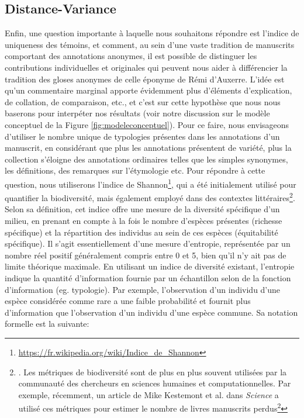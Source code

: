 \documentclass[a4paper, twoside, 12pt]{book}
\begin{document}
{\subsection{Distance-Variance}


Enfin, une question importante à laquelle nous souhaitons répondre est l'indice de \og{} uniqueness \fg{} des témoins, et comment, au sein d'une vaste tradition de manuscrits comportant des annotations anonymes, il est possible de distinguer les contributions individuelles et originales qui peuvent nous aider à différencier la tradition des gloses anonymes de celle éponyme de Rémi d'Auxerre. L'idée est qu'un commentaire marginal apporte évidemment plus d'éléments d'explication, de collation, de comparaison, etc., et c'est sur cette hypothèse que nous nous baserons pour interpéter nos résultats (voir notre discussion sur le modèle conceptuel de la Figure \ref{fig:modeleconceptuel}). Pour ce faire, nous envisageons d'utiliser le nombre unique de typologies présentes dans les annotations d'un manuscrit, en considérant que plus les annotations présentent de variété, plus la collection s'éloigne des annotations \og{}ordinaires\fg{} telles que les \og{}simples\fg{} synonymes, les définitions, des remarques sur l'étymologie etc. Pour répondre à cette question, nous utiliserons l'indice de Shannon\footnote{\url{https://fr.wikipedia.org/wiki/Indice_de_Shannon}}, qui a été initialement utilisé pour quantifier la biodiversité, mais également employé dans des contextes littéraires\footnote{\cite{bache2013diversity}. Les métriques de biodiversité sont de plus en plus souvent utilisées par la communauté des chercheurs en sciences humaines et computationnelles. Par exemple, récemment, un article de Mike Kestemont et al. dans \textit{Science} a utilisé ces métriques pour estimer le nombre de livres manuscrits perdus\footnote{Kestemont et al., \textit{Science}, 2022}}.\\

Selon sa définition, cet indice offre une mesure de la diversité spécifique d'un milieu, en prenant en compte à la fois le nombre d'espèces présentes (richesse spécifique) et la répartition des individus au sein de ces espèces (équitabilité spécifique). Il s'agit essentiellement d'une mesure d'entropie, représentée par un nombre réel positif généralement compris entre 0 et 5, bien qu'il n'y ait pas de limite théorique maximale. En utilisant un indice de diversité existant, l'entropie indique la quantité d'information fournie par un échantillon selon de la fonction d'information (eg. typologie). Par exemple, l'observation d'un individu d'une espèce considérée comme rare a une faible probabilité et fournit plus d'information que l'observation d'un individu d'une espèce commune. Sa notation formelle est la suivante: \\

}
\end{document}
